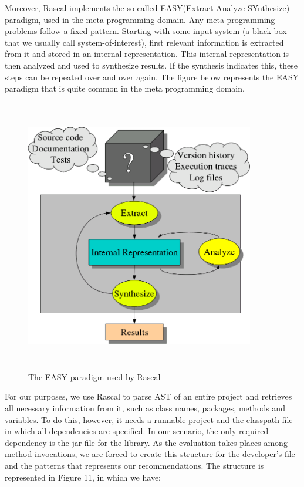 Moreover, Rascal implements the so called EASY(Extract-Analyze-SYnthesize) paradigm, used in the meta programming domain. Any meta-programming problems follow a fixed pattern. Starting with some input system (a black box that we usually call system-of-interest), first relevant information is extracted from it and stored in an internal representation. This internal representation is then analyzed and used to synthesize results. If the synthesis indicates this, these steps can be repeated over and over again. The figure below represents the EASY paradigm that is quite common in the meta programming domain.

\begin{figure}[!h]
\includegraphics[width=10cm,height=12cm,keepaspectratio]{images/EASY.png}
\centering
  \caption{The EASY paradigm used by Rascal}
  \label{fig:cmd}
\end{figure}

For our purposes, we use Rascal to parse AST of an entire project and retrieves all necessary information from it, such as class names, packages, methods and variables.
To do this, however, it needs a runnable project and the classpath file in which all dependencies are specified. In our scenario, the only required dependency is the jar file for the library. As the evaluation takes places among method invocations, we are forced to create this structure for the developer's file and the patterns that represents our recommendations. The structure is represented in Figure 11, in which we have:

